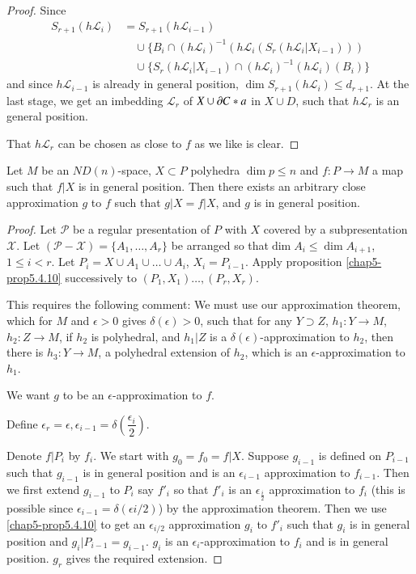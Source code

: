 \begin{proof}
Since
\begin{align*}
S_{r+1}(h\mathscr{L}_{i}) &= S_{r+1}(h\mathscr{L}_{i-1})\\
&\quad \cup \{B_{i}\cap (h\mathscr{L}_{i})^{-1}(h\mathscr{L}_{i}(S_{r}(h\mathscr{L}_{i}|X_{i-1})))\\
&\quad \cup \{S_{r}(h\mathscr{L}_{i}|X_{i-1})\cap (h\mathscr{L}_{i})^{-1}(h\mathscr{L}_{i})(B_{i})\}
\end{align*}
and since $h\mathscr{L}_{i-1}$ is already in general position, $\dim S_{r+1}(h\mathscr{L}_{i})\leq d_{r+1}$. At the last stage, we get an imbedding $\mathscr{L}_{r}$ of $X\cup \partial C\ast a$ in $X\cup D$, such that $h\mathscr{L}_{r}$ is an general position.

That $h\mathscr{L}_{r}$ can be chosen as close to $f$ as we like is clear.
\end{proof}

\begin{theorem}\label{chap5-thm5.4.11}
Let $M$ be an $ND(n)$-space, $X\subset P$ polyhedra $\dim p\leq n$ and $f:P\to M$ a map such that $f|X$ is in general position. Then there exists an arbitrary close approximation $g$ to $f$ such that $g|X=f|X$, and $g$ is in general position. 
\end{theorem}

\begin{proof}
Let $\mathscr{P}$ be a regular presentation of $P$ with $X$ covered by a subpresentation $\mathscr{X}$. Let $(\mathscr{P}-\mathscr{X})=\{A_{1},\ldots,A_{r}\}$ be arranged so that\pageoriginale $\dim A_{i}\leq \dim A_{i+1}$, $1\leq i<r$. Let $P_{i}=X\cup A_{1}\cup\ldots\cup A_{i}$, $X_{i}=P_{i-1}$. Apply proposition \ref{chap5-prop5.4.10} successively to $(P_{1},X_{1})\ldots,(P_{r},X_{r})$.

This requires the following comment: We must use our approximation theorem, which for $M$ and $\epsilon>0$ gives $\delta(\epsilon)>0$, such that for any $Y\supset Z$, $h_{1}:Y\to M$, $h_{2}:Z\to M$, if $h_{2}$ is polyhedral, and $h_{1}|Z$ is a $\delta(\epsilon)$-approximation to $h_{2}$, then there is $h_{3}:Y\to M$, a polyhedral extension of $h_{2}$, which is an $\epsilon$-approximation to $h_{1}$.

We want $g$ to be an $\epsilon$-approximation to $f$.

Define $\epsilon_{r}=\epsilon,\epsilon_{i-1}=\delta\left(\dfrac{\epsilon_{i}}{2}\right)$. 

Denote $f|P_{i}$ by $f_{i}$. We start with $g_{0}=f_{0}=f|X$. Suppose $g_{i-1}$ is defined on $P_{i-1}$ such that $g_{i-1}$ is in general position and is an $\epsilon_{i-1}$ approximation to $f_{i-1}$. Then we first extend $g_{i-1}$ to $P_{i}$ say $f'_{i}$ so that $f'_{i}$ is an $\epsilon_{\frac{i}{2}}$ approximation to $f_{i}$ (this is possible since $\epsilon_{i-1}=\delta(\epsilon i/2)$) by the approximation theorem. Then we use \ref{chap5-prop5.4.10} to get an $\epsilon_{i/2}$ approximation $g_{i}$ to $f'_{i}$ such that $g_{i}$ is in general position and $g_{i}|P_{i-1}=g_{i-1}$. $g_{i}$ is an $\epsilon_{i}$-approximation to $f_{i}$ and is in general position. $g_{r}$ gives the required extension.
\end{proof}

